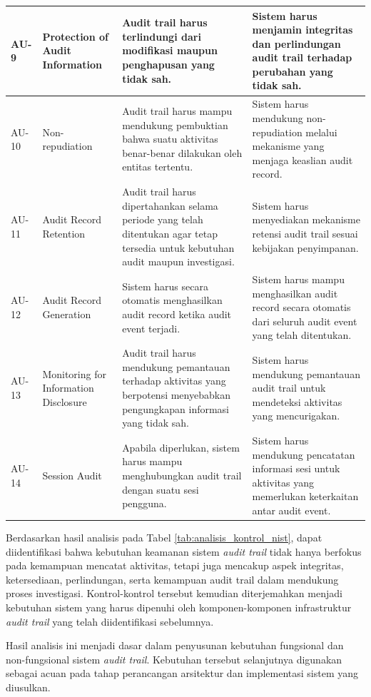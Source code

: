 \begin{xltabular}{\textwidth}{|p{1.8cm}|p{3.5cm}|X|X|}
AU-9 &
Protection of Audit Information &
Audit trail harus terlindungi dari modifikasi maupun penghapusan yang tidak sah. &
Sistem harus menjamin integritas dan perlindungan audit trail terhadap perubahan yang tidak sah.\\
\hline

AU-10 &
Non-repudiation &
Audit trail harus mampu mendukung pembuktian bahwa suatu aktivitas benar-benar dilakukan oleh entitas tertentu. &
Sistem harus mendukung non-repudiation melalui mekanisme yang menjaga keaslian audit record.\\
\hline

AU-11 &
Audit Record Retention &
Audit trail harus dipertahankan selama periode yang telah ditentukan agar tetap tersedia untuk kebutuhan audit maupun investigasi. &
Sistem harus menyediakan mekanisme retensi audit trail sesuai kebijakan penyimpanan.\\
\hline

AU-12 &
Audit Record Generation &
Sistem harus secara otomatis menghasilkan audit record ketika audit event terjadi. &
Sistem harus mampu menghasilkan audit record secara otomatis dari seluruh audit event yang telah ditentukan.\\
\hline

AU-13 &
Monitoring for Information Disclosure &
Audit trail harus mendukung pemantauan terhadap aktivitas yang berpotensi menyebabkan pengungkapan informasi yang tidak sah. &
Sistem harus mendukung pemantauan audit trail untuk mendeteksi aktivitas yang mencurigakan.\\
\hline

AU-14 &
Session Audit &
Apabila diperlukan, sistem harus mampu menghubungkan audit trail dengan suatu sesi pengguna. &
Sistem harus mendukung pencatatan informasi sesi untuk aktivitas yang memerlukan keterkaitan antar audit event.\\
\hline

\end{xltabular}

Berdasarkan hasil analisis pada Tabel \ref{tab:analisis_kontrol_nist}, dapat diidentifikasi bahwa kebutuhan keamanan sistem \textit{audit trail} tidak hanya berfokus pada kemampuan mencatat aktivitas, tetapi juga mencakup aspek integritas, ketersediaan, perlindungan, serta kemampuan audit trail dalam mendukung proses investigasi. Kontrol-kontrol tersebut kemudian diterjemahkan menjadi kebutuhan sistem yang harus dipenuhi oleh komponen-komponen infrastruktur \textit{audit trail} yang telah diidentifikasi sebelumnya.

Hasil analisis ini menjadi dasar dalam penyusunan kebutuhan fungsional dan non-fungsional sistem \textit{audit trail}. Kebutuhan tersebut selanjutnya digunakan sebagai acuan pada tahap perancangan arsitektur dan implementasi sistem yang diusulkan.